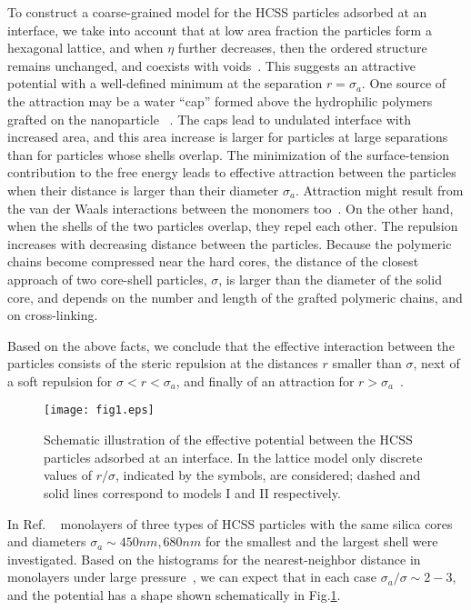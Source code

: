 \documentclass[preprint,
prl,%
aps]{revtex4}
\begin{document}
To construct a coarse-grained  model for the HCSS particles adsorbed at an interface, 
we take into account that at  low area fraction the particles form a hexagonal lattice, 
 and  when $\eta$ further decreases, 
then the ordered structure remains unchanged, and
coexists with voids~\cite{rauh:16:0}. This suggests an attractive potential with 
a well-defined minimum at the separation $r=\sigma_a$. 
One source of the attraction may be 
a water ``cap''  formed above  the hydrophilic polymers grafted on the nanoparticle
 ~\cite{rauh:16:0}.
The caps lead to undulated interface with increased area, and this area increase is larger for particles
at large separations than for 
particles whose shells overlap. 
 The minimization of the surface-tension contribution to the free energy leads to 
effective attraction between the particles 
when their distance is larger than their diameter $\sigma_a$. Attraction might result from the van der Waals 
interactions between the monomers too~\cite{chremos:16:0}. 
On the other hand, when the shells of the two particles overlap,
they repel each other. The repulsion increases with decreasing distance between the particles.
Because the polymeric chains become compressed near the hard cores, the distance of the closest 
approach of two core-shell particles, $\sigma$, is larger than
the diameter of the solid core,  
and depends on the number and length of the grafted polymeric chains, and on cross-linking.
 
Based on the above facts, we conclude that the
effective interaction between the particles consists of the
steric repulsion at the distances $r$ smaller than  $\sigma$, next
of a soft repulsion for $\sigma<r<\sigma_a$, 
and finally of an attraction for $r>\sigma_a$~\cite{rauh:16:0}. 
%
\begin{figure}[h]
\centering
\texttt{[image: fig1.eps]}
\caption{Schematic illustration of the effective potential between the HCSS particles
adsorbed at an interface.
In the lattice model only discrete values of $r/\sigma$, indicated by the symbols, are considered; 
dashed and solid lines correspond to models I and II respectively. 
}
\label{fig.sketch}
\end{figure}

In Ref. ~\cite{rauh:16:0} monolayers of three types of HCSS particles with the same silica cores
and 
diameters $\sigma_a\sim 450nm,680 nm$ for the smallest and the largest shell
were investigated.
Based on the histograms for the nearest-neighbor distance in monolayers under large pressure~\cite{rauh:16:0:ESI}, we can
 expect that in each case $\sigma_a/\sigma \sim 2-3$, and the potential has a shape shown
 schematically in  Fig.\ref{fig.sketch}. 
\end{document}
